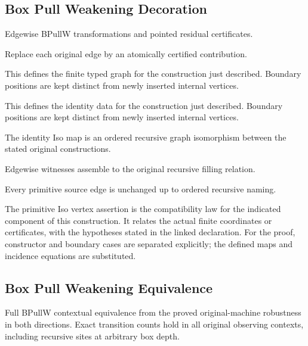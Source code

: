 \subsection{Box Pull Weakening Decoration}
Edgewise BPullW transformations and pointed residual certificates.

Replace each original edge by an atomically certified contribution.
\par{}

This defines the finite typed graph for the construction just described. Boundary positions are kept distinct from newly inserted internal vertices.
\par{}

This defines the identity data for the construction just described. Boundary positions are kept distinct from newly inserted internal vertices.
\par{}

The identity Iso map is an ordered recursive graph isomorphism between the stated original constructions.
\par{}

Edgewise witnesses assemble to the original recursive filling relation.
\par{}

Every primitive source edge is unchanged up to ordered recursive naming.
\par{}

The primitive Iso vertex assertion is the compatibility law for the indicated component of this construction. It relates the actual finite coordinates or certificates, with the hypotheses stated in the linked declaration.
For the proof, constructor and boundary cases are separated explicitly; the defined maps and incidence equations are substituted.
\par{}

\subsection{Box Pull Weakening Equivalence}
Full BPullW contextual equivalence from the proved original-machine robustness in both directions. Exact transition counts hold in all original observing contexts, including recursive sites at arbitrary box depth.

